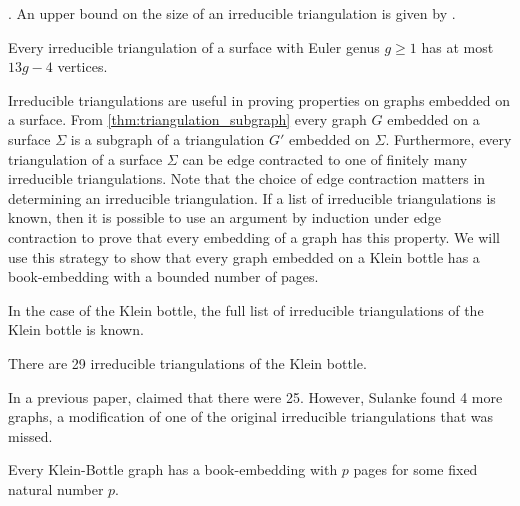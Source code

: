 . An upper bound on the size of an irreducible triangulation is given by \textcite{joretIrreducibleTriangulationsAre2010}.

\begin{theorem}\textcite{joretIrreducibleTriangulationsAre2010}
    Every irreducible triangulation of a surface with Euler genus $g \geq 1$ has at most $13g - 4$ vertices. 
\end{theorem}

Irreducible triangulations are useful in proving properties on graphs embedded on a surface. From \cref{thm:triangulation_subgraph} every graph $G$ embedded on a surface $\Sigma$ is a subgraph of a triangulation $G'$ embedded on $\Sigma$. Furthermore, every triangulation of a surface $\Sigma$ can be edge contracted to one of finitely many irreducible triangulations. Note that the choice of edge contraction matters in determining an irreducible triangulation. If a list of irreducible triangulations is known, then it is possible to use an argument by induction under edge contraction to prove that every embedding of a graph has this property. We will use this strategy to show that every graph embedded on a Klein bottle has a book-embedding with a bounded number of pages. 

In the case of the Klein bottle, the full list of irreducible triangulations of the Klein bottle is known. 
\begin{theorem}
    There are 29 irreducible triangulations of the Klein bottle. 
\end{theorem} 
In a previous paper, \textcite{lawrencenkoIrreducibleTriangulationsKlein1997} claimed that there were 25. However, Sulanke found 4 more graphs, a modification of one of the original irreducible triangulations that was missed. 

\begin{conjecture}\label{conj:klein_bottle_embedding}
    Every Klein-Bottle graph has a book-embedding with $p$ pages for some fixed natural number $p$. 
\end{conjecture}

